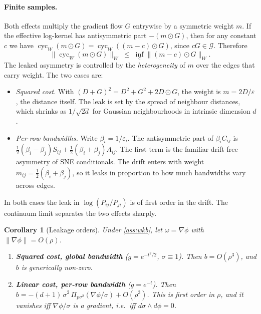 \documentclass{article}
\theoremstyle{plain}
\newtheorem{corollary}[theorem]{Corollary}
\theoremstyle{definition}
\theoremstyle{remark}
\newcommand{\eps}{\varepsilon}
\newcommand{\1}{\mathbf{1}}
\newcommand{\Grad}{\mathcal{G}}
\newcommand{\cyc}{\operatorname{cyc}}
\newcommand{\Leray}{\Pi}
\begin{document}
\paragraph{Finite samples.}
Both effects multiply the gradient flow $G$ entrywise by a symmetric weight
$m$. If the effective log-kernel has antisymmetric part $-(m\odot G)$, then
for any constant $c$ we have $\cyc_W(m\odot G)=\cyc_W((m-c)\odot G)$, since
$cG\in\Grad$. Therefore
\begin{equation}
  \big\|\cyc_W(m\odot G)\big\|_W\;\le\;\inf_{c}\big\|(m-c)\odot G\big\|_W .
  \label{eq:leakbound}
\end{equation}
The leaked asymmetry is controlled by the \emph{heterogeneity} of $m$ over
the edges that carry weight. The two cases are:
\begin{itemize}
  \item \emph{Squared cost.} With $(D+G)^2=D^2+G^2+2D\odot G$, the weight is
    $m=2D/\eps$, the distance itself. The leak is set by the spread of
    neighbour distances, which shrinks as $1/\sqrt{2d}$ for Gaussian
    neighbourhoods in intrinsic dimension $d$.
  \item \emph{Per-row bandwidths.} Write $\beta_i=1/\eps_i$. The
    antisymmetric part of $\beta_iC_{ij}$ is
    $\tfrac12(\beta_i-\beta_j)S_{ij}+\tfrac12(\beta_i+\beta_j)A_{ij}$. The
    first term is the familiar drift-free asymmetry of SNE conditionals.
    The drift enters with weight $m_{ij}=\tfrac12(\beta_i+\beta_j)$, so it
    leaks in proportion to how much bandwidths vary across edges.
\end{itemize}
In both cases the leak in $\log(P_{ij}/P_{ji})$ is of first order in the
drift. The continuum limit separates the two effects sharply.

\begin{corollary}[Leakage orders]
  \label{cor:leak}
  Under \cref{ass:wkb}, let $\omega=\nabla\phi$ with $\|\nabla\phi\|=O(\rho)$.
  \begin{enumerate}
    \item \textbf{Squared cost, global bandwidth} ($g=e^{-t^2/2}$,
      $\sigma\equiv1$). Then $b=O(\rho^3)$, and $b$ is generically
      non-zero.
    \item \textbf{Linear cost, per-row bandwidth} ($g=e^{-t}$). Then
      $b=-(d+1)\,\sigma^2\,\Leray_{p\sigma^2}(\nabla\phi/\sigma)+O(\rho^3)$.
      This is first order in $\rho$, and it vanishes iff
      $\nabla\phi/\sigma$ is a gradient, i.e.\ iff
      $d\sigma\wedge d\phi=0$.
  \end{enumerate}
\end{corollary}
\end{document}
